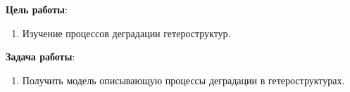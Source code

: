 \Introduction

\textbf{Цель работы}:
\begin{enumerate}
	\item Изучение процессов деградации гетероструктур.
\end{enumerate}

\textbf{Задача работы}:
\begin{enumerate}
	\item Получить модель описывающую процессы деградации в гетероструктурах.
\end{enumerate}